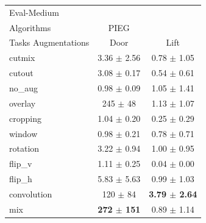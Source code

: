 \begin{tabular}{lcc}
Eval-Medium & & \\
Algorithms & PIEG & \\
Tasks Augmentations & Door & Lift \\
cutmix          & 3.36 $\pm$ 2.56 & 0.78 $\pm$ 1.05 \\
cutout          & 3.08 $\pm$ 0.17 & 0.54 $\pm$ 0.61 \\
no\_aug         & 0.98 $\pm$ 0.09 & 1.05 $\pm$ 1.41 \\
overlay         & 245 $\pm$ 48 & 1.13 $\pm$ 1.07 \\
cropping        & 1.04 $\pm$ 0.20 & 0.25 $\pm$ 0.29 \\
window          & 0.98 $\pm$ 0.21 & 0.78 $\pm$ 0.71 \\
rotation        & 3.22 $\pm$ 0.94 & 1.00 $\pm$ 0.95 \\
flip\_v         & 1.11 $\pm$ 0.25 & 0.04 $\pm$ 0.00 \\
flip\_h         & 5.83 $\pm$ 5.63 & 0.99 $\pm$ 1.03 \\
convolution     & 120 $\pm$ 84 & \textbf{3.79 $\pm$ 2.64} \\
mix             & \textbf{272 $\pm$ 151} & 0.89 $\pm$ 1.14 \\
\end{tabular}